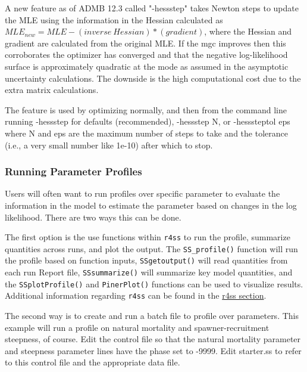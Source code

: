 A new feature as of ADMB 12.3 called "-hess{\textunderscore}step" takes Newton steps to update the MLE using the information in the Hessian calculated as $MLE_{new}=MLE-(inverse~Hessian)*(gradient)$, where the Hessian and gradient are calculated from the original MLE. If the mgc improves then this corroborates the optimizer has converged and that the negative log-likelihood surface is approximately quadratic at the mode as assumed in the asymptotic uncertainty calculations. The downside is the high computational cost due to the extra matrix calculations.

The feature is used by optimizing normally, and then from the command line running -hess{\textunderscore}step for defaults (recommended), -hess{\textunderscore}step N, or -hess{\textunderscore}step{\textunderscore}tol eps where N and eps are the maximum number of steps to take and the tolerance (i.e., a very small number like 1e-10) after which to stop.

\subsubsection{Running Parameter Profiles}
Users will often want to run profiles over specific parameter to evaluate the information in the model to estimate the parameter based on changes in the log likelihood.  There are two ways this can be done.

The first option is the use functions within \texttt{r4ss} to run the profile, summarize quantities across runs, and plot the output.  The \texttt{SS\_profile()} function will run the profile based on function inputs, \texttt{SSgetoutput()} will read quantities from each run Report file, \texttt{SSsummarize()} will summarize key model quantities, and the \texttt{SSplotProfile()} and \texttt{PinerPlot()} functions can be used to visualize results.  Additional information regarding \texttt{r4ss} can be found in the \hyperref[sec:r4ss]{r4ss section}. 

The second way is to create and run a batch file to profile over parameters. This example will run a profile on natural mortality and spawner-recruitment steepness, of course.  Edit the control file so that the natural mortality parameter and steepness parameter lines have the phase set to -9999.  Edit starter.ss to refer to this control file and the appropriate data file.

